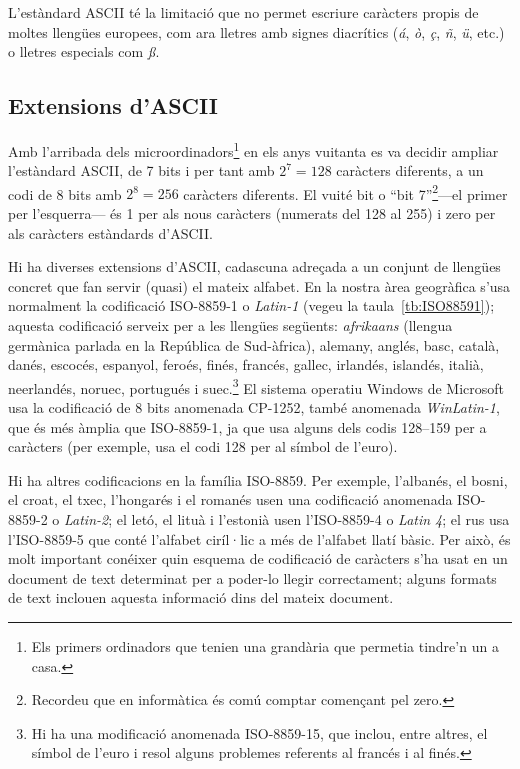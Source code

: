 L'estàndard ASCII té la limitació que no permet escriure caràcters
propis de moltes llengües europees, com ara lletres amb signes
diacrítics (\emph{á}, \emph{ò}, \emph{ç}, \emph{ñ}, \emph{ü}, etc.) o
lletres especials com \emph{ß}.


\subsection{Extensions d'ASCII} \label{s3:ISO}
Amb l'arribada dels microordinadors\footnote{Els primers ordinadors
  que tenien una grandària que permetia tindre'n un a casa.} en els anys
vuitanta es va decidir ampliar l'estàndard ASCII, de 7 bits i per tant
amb $2^7=128$ caràcters diferents, a un codi de 8 bits amb $2^8=256$
caràcters diferents. El vuité bit o ``bit 7''\footnote{Recordeu que en
  informàtica és comú comptar començant pel zero.}---el primer per
l'esquerra--- és 1 per als nous caràcters (numerats del 128 al 255) i
zero per als caràcters estàndards d'ASCII.

Hi ha diverses extensions d'ASCII, cadascuna adreçada a un conjunt de
llengües concret que fan servir (quasi) el mateix alfabet. En la
nostra àrea geogràfica s'usa normalment la codificació ISO-8859-1 o
\emph{Latin-1} (vegeu la taula~\ref{tb:ISO88591}); aquesta codificació
serveix per a les llengües següents: \emph{afrikaans} (llengua
germànica parlada en la República de Sud-àfrica), alemany, anglés,
basc, català, danés, escocés, espanyol, feroés, finés, francés,
gallec, irlandés, islandés, italià, neerlandés, noruec, portugués i
suec.\footnote{Hi ha una modificació anomenada ISO-8859-15, que
  inclou, entre altres, el símbol de l'euro i resol alguns problemes
  referents al francés i al finés.}  El sistema operatiu Windows de
Microsoft usa la codificació de 8 bits anomenada CP-1252, també
anomenada \emph{WinLatin-1}, que és més àmplia que ISO-8859-1, ja que
usa alguns dels codis 128--159 per a caràcters (per exemple, usa el
codi 128 per al símbol de l'euro).

Hi ha altres codificacions en la família ISO-8859. Per exemple,
l'albanés, el bosni, el croat, el txec, l'hongarés i el romanés usen
una codificació anomenada ISO-8859-2 o \emph{Latin-2}; el letó, el
lituà i l'estonià usen l'ISO-8859-4 o \emph{Latin 4}; el rus usa
l'ISO-8859-5 que conté l'alfabet ciríl·lic a més de l'alfabet llatí
bàsic. Per això, és molt important conéixer quin esquema de
codificació de caràcters s'ha usat en un document de text determinat
per a poder-lo llegir correctament; alguns formats de text inclouen
aquesta informació dins del mateix document.


